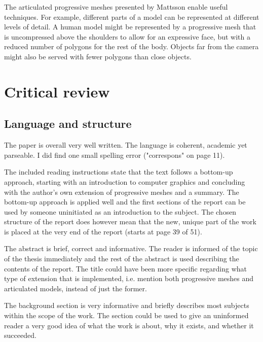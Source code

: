 \documentclass{article}
\begin{document}
The articulated progressive meshes presented by Mattsson enable useful
techniques. For example, different parts of a model can be represented at
different levels of detail. A human model might be represented by a progressive
mesh that is uncompressed above the shoulders to allow for an expressive face,
but with a reduced number of polygons for the rest of the body. Objects far from
the camera might also be served with fewer polygons than close objects.

\newpage

\section{Critical review}

\subsection{Language and structure}

The paper is overall very well written. The language is coherent, academic yet
parseable. I did find one small spelling error ("correspons" on page 11).

The included reading instructions state that the text follows a bottom-up
approach, starting with an introduction to computer graphics and concluding with
the author's own extension of progressive meshes and a summary. The bottom-up
approach is applied well and the first sections of the report can be used by
someone uninitiated as an introduction to the subject. The chosen structure of
the report does however mean that the new, unique part of the work is placed at
the very end of the report (starts at page 39 of 51).

The abstract is brief, correct and informative. The reader is informed of the
topic of the thesis immediately and the rest of the abstract is used describing
the contents of the report. The title could have been more specific regarding
what type of extension that is implemented, i.e. mention both progressive
meshes and articulated models, instead of just the former.

The background section is very informative and briefly describes most subjects
within the scope of the work. The section could be used to give an uninformed
reader a very good idea of what the work is about, why it exists, and whether it
succeeded.
\end{document}
